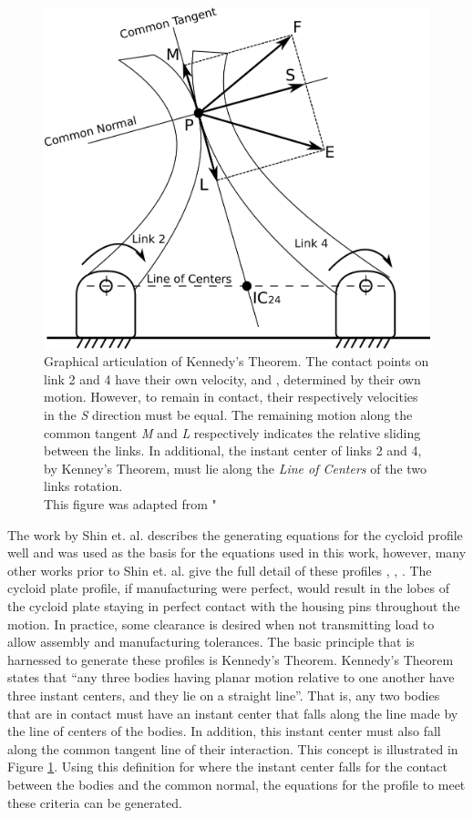 \begin{figure}[!b]
   \centering
   \includegraphics[width=0.60\linewidth]{fig/kennedy_sliding}
   \caption{Graphical articulation of Kennedy's Theorem. The contact points on link 2 and 4 have their own velocity,  and , determined by their own motion. However, to remain in contact, their respectively velocities in the \textit{S} direction must be equal. The remaining motion along the common tangent \textit{M} and \textit{L} respectively indicates the relative sliding between the links. In additional, the instant center of links 2 and 4, by Kenney's Theorem, must lie along the \textit{Line of Centers} of the two links rotation. \\This figure was adapted from \cite{ref:kinematics_and_dynamics}"}
   \label{fig:kennedy_sliding}
\end{figure}

The work by Shin et. al. \cite{ref:on_the_lobe} describes the generating equations for the cycloid profile well and was used as the basis for the equations used in this work, however, many other works prior to Shin et. al. give the full detail of these profiles \cite{ref:malhorta_2}, \cite{ref:hwang_hsieh}, \cite{ref:design_and_application}.
The cycloid plate profile, if manufacturing were perfect, would result in the lobes of the cycloid plate staying in perfect contact with the housing pins throughout the motion. In practice, some clearance is desired when not transmitting load to allow assembly and manufacturing tolerances. The basic principle that is harnessed to generate these profiles is Kennedy's Theorem. Kennedy's Theorem states that ``any three bodies having planar motion relative to one another have three instant centers, and they lie on a straight line''\cite{ref:kinematics_and_dynamics}.  That is, any two bodies that are in contact must have an instant center that falls along the line made by the line of centers of the bodies. In addition, this instant center must also fall along the common tangent line of their interaction. This concept is illustrated in Figure \ref{fig:kennedy_sliding}. Using this definition for where the instant center falls for the contact between the bodies and the common normal, the equations for the profile to meet these criteria can be generated. 

